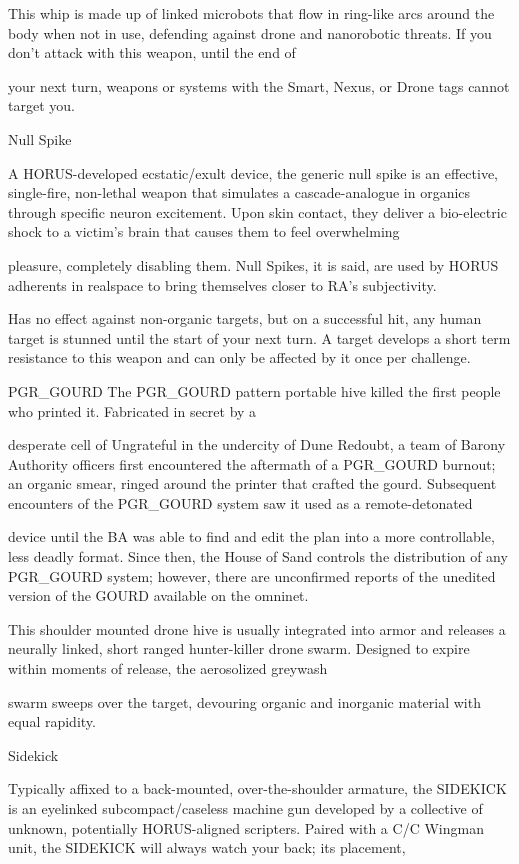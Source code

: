 This whip is made up of linked microbots that flow in ring-like arcs around the body when not in use,
defending against drone and nanorobotic threats. If you don't attack with this weapon, until the end of

your next turn, weapons or systems with the Smart, Nexus, or Drone tags cannot target you.


Null Spike

A HORUS-developed ecstatic/exult device, the generic null spike is an effective, single-fire, non-lethal
weapon that simulates a cascade-analogue in organics through specific neuron excitement. Upon skin
contact, they deliver a bio-electric shock to a victim's brain that causes them to feel overwhelming

pleasure, completely disabling them. Null Spikes, it is said, are used by HORUS adherents in realspace to
bring themselves closer to RA's subjectivity.





Has no effect against non-organic targets, but on a successful hit, any human target is stunned until the
start of your next turn. A target develops a short term resistance to this weapon and can only be affected
by it once per challenge.


PGR\_GOURD
The PGR\_GOURD pattern portable hive killed the first people who printed it. Fabricated in secret by a

desperate cell of Ungrateful in the undercity of Dune Redoubt, a team of Barony Authority officers first
encountered the aftermath of a PGR\_GOURD burnout; an organic smear, ringed around the printer that
crafted the gourd. Subsequent encounters of the PGR\_GOURD system saw it used as a remote-detonated

device until the BA was able to find and edit the plan into a more controllable, less deadly format. Since
then, the House of Sand controls the distribution of any PGR\_GOURD system; however, there are
unconfirmed reports of the unedited version of the GOURD available on the omninet.

This shoulder mounted drone hive is usually integrated into armor and releases a neurally linked, short
ranged hunter-killer drone swarm. Designed to expire within moments of release, the aerosolized greywash

swarm sweeps over the target, devouring organic and inorganic material with equal rapidity.


Sidekick

Typically affixed to a back-mounted, over-the-shoulder armature, the SIDEKICK is an eyelinked
subcompact/caseless machine gun developed by a collective of unknown, potentially HORUS-aligned
scripters. Paired with a C/C Wingman unit, the SIDEKICK will always watch your back; its placement,

